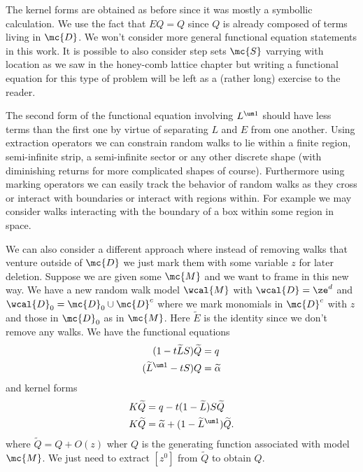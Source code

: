  The kernel forms are obtained as before since it was mostly a symbollic calculation. We use the fact that $EQ = Q$ since $Q$ is already composed of terms living in $\mc{D}$. We won't consider more general functional equation statements in this work. It is possible to also consider step sets $\mc{S}$ varrying with location as we saw in the honey-comb lattice chapter but writing a functional equation for this type of problem will be left as a (rather long) exercise to the reader.

The second form of the functional equation involving $L^{\um 1}$ should have less terms than the first one by virtue of separating $L$ and $E$ from one another. Using extraction operators we can constrain random walks to lie within a finite region, semi-infinite strip, a semi-infinite sector or any other discrete shape (with diminishing returns for more complicated shapes of course). Furthermore using marking operators we can easily track the behavior of random walks as they cross or interact with boundaries or interact with regions within. For example we may consider walks interacting with the boundary of a box within some region in space. 

\begin{example} We can also consider a different approach where instead of removing walks that venture outside of $\mc{D}$ we just mark them with some variable $z$ for later deletion. Suppose we are given some $\mc{M}$ and we want to frame in this new way. We have a new random walk model $\wcal{M}$ with $\wcal{D} = \ze^d$ and $\wcal{D}_0 = \mc{D}_0 \cup \mc{D}^c$ where we mark monomials in $\mc{D}^c$ with $z$ and those in $\mc{D}_0$ as in $\mc{M}$. Here $\widetilde{E}$ is the identity since we don't remove any walks. We have the functional equations
\begin{align}
(1-t\widetilde{L} S)\widetilde Q &= q\\
(\widetilde{L}^{\um 1}-tS) Q &= \widetilde{\alpha}
\end{align}
and kernel forms
\begin{align}
	K\widetilde Q &= q - t(1-\widetilde L)S \widetilde Q\\
	K\widetilde Q &=\widetilde \alpha + (1-\widetilde{L}^{\um 1}) \widetilde Q.
\end{align}
where $\widetilde Q = Q + O(z)$ wher $Q$ is the generating function associated with model $\mc{M}$. We just need to extract $[z^0]$ from $\widetilde Q$ to obtain $Q$. 
\end{example}

